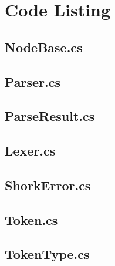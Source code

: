 \section{Code Listing}

\subsection{NodeBase.cs}


\subsection{Parser.cs}


\subsection{ParseResult.cs}


\subsection{Lexer.cs}


\subsection{ShorkError.cs}


\subsection{Token.cs}


\subsection{TokenType.cs}
